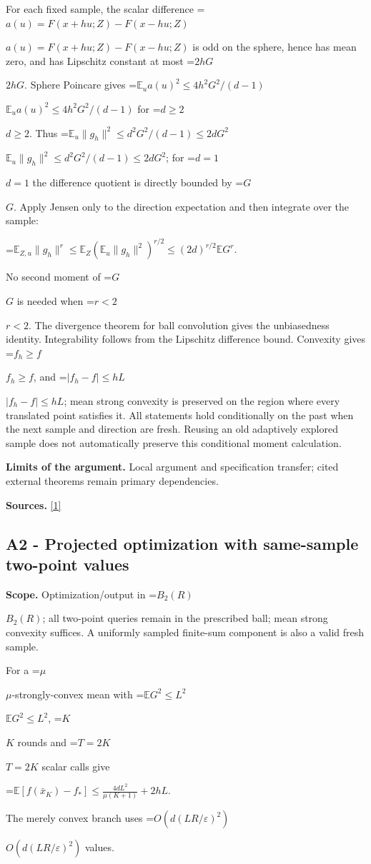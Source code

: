 \documentclass[10pt,a4paper]{article}
\newcommand{\AtlasMath}[1]{\par\begingroup\centering\setbox0=\hbox{$\displaystyle #1$}\ifdim\wd0>1.4\linewidth\typeout{ATLAS WIDE FORMULA: \the\wd0}\fi\ifdim\wd0>\linewidth\resizebox{\linewidth}{!}{\box0}\else\box0\fi\par\endgroup}
\newcommand{\AtlasInlineMath}[1]{\begingroup\setbox0=\hbox{$#1$}\ifdim\wd0>.4\linewidth\endgroup\AtlasMath{#1}\else\endgroup$#1$\fi}
\begin{document}
For each fixed sample, the scalar difference \AtlasInlineMath{a(u)=F(x+hu;Z)-F(x-hu;Z)} is odd on the sphere, hence has mean zero, and has Lipschitz constant at most \AtlasInlineMath{2hG}. Sphere Poincare gives \AtlasInlineMath{\mathbb E_u a(u)^2\le4h^2G^2/(d-1)} for \AtlasInlineMath{d\ge2}. Thus \AtlasInlineMath{\mathbb E_u\|g_h\|^2\le d^2G^2/(d-1)\le2dG^2}; for \AtlasInlineMath{d=1} the difference quotient is directly bounded by \AtlasInlineMath{G}. Apply Jensen only to the direction expectation and then integrate over the sample:

\AtlasMath{\mathbb E_{Z,u}\|g_h\|^r\le\mathbb E_Z(\mathbb E_u\|g_h\|^2)^{r/2}\le(2d)^{r/2}\mathbb E G^r.}

No second moment of \AtlasInlineMath{G} is needed when \AtlasInlineMath{r<2}. The divergence theorem for ball convolution gives the unbiasedness identity. Integrability follows from the Lipschitz difference bound. Convexity gives \AtlasInlineMath{f_h\ge f}, and \AtlasInlineMath{|f_h-f|\le hL}; mean strong convexity is preserved on the region where every translated point satisfies it. All statements hold conditionally on the past when the next sample and direction are fresh. Reusing an old adaptively explored sample does not automatically preserve this conditional moment calculation.

\textbf{Limits of the argument.} Local argument and specification transfer; cited external theorems remain primary dependencies.

\textbf{Sources.} \href{https://jmlr.org/papers/volume18/16-632/16-632.pdf}{[1]}

\subsection{A2 - Projected optimization with same-sample two-point values}
\textbf{Scope.} Optimization/output in \AtlasInlineMath{B_2(R)}; all two-point queries remain in the prescribed ball; mean strong convexity suffices. A uniformly sampled finite-sum component is also a valid fresh sample.

For a \AtlasInlineMath{\mu}-strongly-convex mean with \AtlasInlineMath{\mathbb E G^2\le L^2}, \AtlasInlineMath{K} rounds and \AtlasInlineMath{T=2K} scalar calls give

\AtlasMath{\mathbb E[f(\bar x_K)-f_*]\le\frac{4dL^2}{\mu(K+1)}+2hL.}

The merely convex branch uses \AtlasInlineMath{O(d(LR/\varepsilon)^2)} values.
\end{document}
